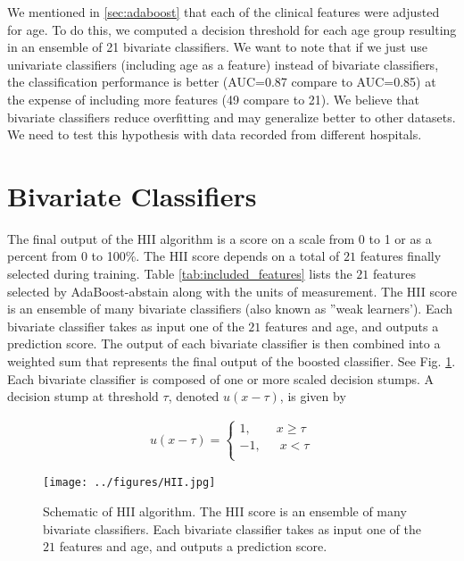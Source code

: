 \documentclass[
   technote
]{phildoc}
\newcommand{\hii}{HII}
\newcommand{\fig}{Fig.}
\begin{document}
We mentioned in \ref{sec:adaboost} that each of the clinical features were adjusted for age. To do this, we computed a decision threshold for each age group resulting in an ensemble of 21 bivariate classifiers. We want to note that if we just use univariate classifiers (including age as a feature) instead of bivariate classifiers, the classification performance is better (AUC=0.87 compare to AUC=0.85) at the expense of including more features (49 compare to 21). We believe that bivariate classifiers reduce overfitting and may generalize better to other datasets. We need to test this hypothesis with data recorded from different hospitals.    


\section{Bivariate Classifiers}
\label{sec:bivariate_clf}

The final output of the \hii{} algorithm is a score on a scale from 0 to 1 or as a percent from 0 to 100\%. The \hii{} score depends on a total of $21$ features finally selected during training. Table \ref{tab:included_features} lists the $21$ features selected by AdaBoost-abstain along with the units of measurement. The \hii{} score is an ensemble of many bivariate classifiers (also known as ''weak learners'). Each bivariate classifier takes as input one of the $21$ features and age, and outputs a prediction score. The output of each bivariate classifier is then combined into a weighted sum that represents the final output of the boosted classifier. See \fig{} \ref{fig:bivariate_clf}. Each bivariate classifier is composed of one or more scaled decision stumps. A decision stump at threshold $\tau$, denoted $u(x-\tau)$, is given by

\begin{eqnarray}
u(x-\tau) =
\begin{cases}  
1, \quad \phantom{\infty}x \geq \tau \\
-1, \quad \phantom{0} x<\tau\\
\end{cases}
\end{eqnarray}

\begin{figure}[h!]
	\centering
	\texttt{[image: ../figures/HII.jpg]}
	\caption{Schematic of \hii{} algorithm. The \hii{} score is an ensemble of many bivariate classifiers. Each bivariate classifier takes as input one of the $21$ features and age, and outputs a prediction score.} 
	\label{fig:bivariate_clf}      
\end{figure}
\end{document}
